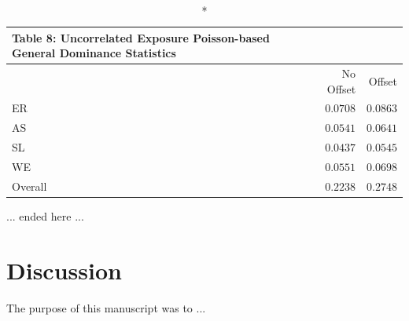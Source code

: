 \documentclass[ShortAfour,times,sageapa]{sagej}
\begin{document}
	\begin{longtable}{l|rr}
		\caption*{
			{\large Table 8: Uncorrelated Exposure Poisson-based General Dominance Statistics}
		} \\ 
		\toprule
		\multicolumn{1}{l}{} & No Offset & Offset \\ 
		\midrule
		ER & $0.0708$ & $0.0863$ \\ 
		AS & $0.0541$ & $0.0641$ \\ 
		SL & $0.0437$ & $0.0545$ \\ 
		WE & $0.0551$ & $0.0698$ \\ 
		\midrule
		Overall & $0.2238$ & $0.2748$ \\ 
		\bottomrule
	\end{longtable}
	
	... ended here ...
	
	
\section{Discussion}

	The purpose of this manuscript was to ...
	
	




	
\end{document}
